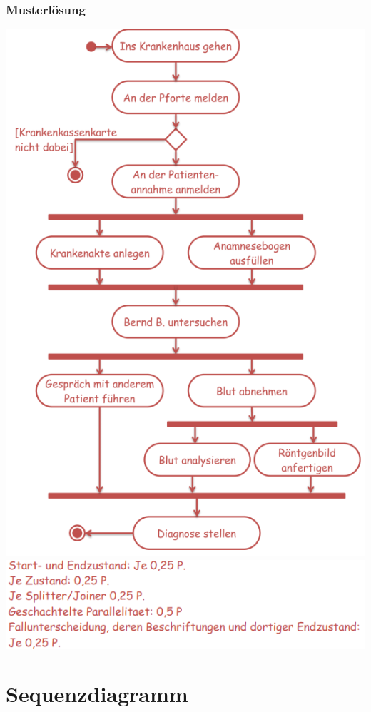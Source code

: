\documentclass[18pt]{beamer}
\begin{document}
\begin{frame}
\frametitle{Musterlösung}
\centering
\includegraphics[scale=0.35]{./pics/tut2/solution-act.png}
\includegraphics[scale=0.4]{./pics/tut2/solution-act-points.png}
\end{frame}

\section{Sequenzdiagramm}
\end{document}
